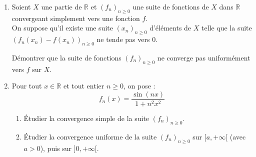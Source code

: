 \documentclass[a4paper,twoside,french,11pt]{VcCours}
\begin{document}
\begin{Exercice}{} \begin{enumerate}
\item Soient $X$ une partie de $\mathbb{R}$ et $\left( f_{n}\right) _{n \geq 0}$ une suite de fonctions de $X$ dans $\mathbb{R}$ convergeant simplement vers une fonction $f$. \\
On suppose qu'il existe une suite $\left( x_{n}\right)_{n \geq 0}$ d'éléments de $X$ telle que la suite $\left( f_{n}(x_{n})-f\left( x_{n}\right) \right) _{n \geq 0}$ ne tende pas vers $0$. \medskip

Démontrer que la suite de fonctions $\left( f_{n}\right) _{n \geq 0}$ ne converge pas uniformément vers $f$ sur $X$.

\item Pour tout $x\in\mathbb{R}$ et tout entier $n \geq 0$, on pose :
$$f_{n}(x) =\dfrac{\sin \left( nx\right) }{1+n^{2}x^{2}}$$
	\begin{enumerate}
	\item \'Etudier la convergence simple de la suite $\left( f_{n}\right)_{n \geq 0}$.
	\item \'Etudier la convergence uniforme de la suite $\left( f_{n}\right)_{n \geq 0}$ sur $[a,+\infty[$ (avec $a>0$),  puis sur $]0,+\infty[$.
	\end{enumerate}
\end{enumerate}
\end{Exercice}

\newpage
\end{document}
